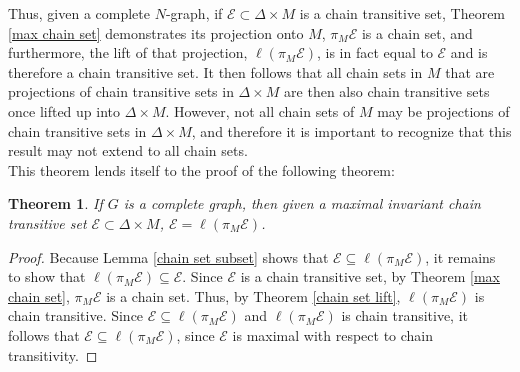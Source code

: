 \documentclass[11pt]{article}
\newtheorem{thm}{Theorem}
\begin{document}
Thus, given a complete $N$-graph, if $\mathcal{E}\subset\Delta\times M$ is a chain transitive set, Theorem \ref{max chain set} demonstrates its projection onto $M$, $\pi_M\mathcal{E}$ is a chain set, and furthermore, the lift of that projection, $\ell(\pi_M\mathcal{E})$, is in fact equal to $\mathcal{E}$ and is therefore a chain transitive set.  It then follows that all chain sets in $M$ that are projections of chain transitive sets in $\Delta\times M$ are then also chain transitive sets once lifted up into $\Delta\times M$.  However, not all chain sets of $M$ may be projections of chain transitive sets in $\Delta\times M$, and therefore it is important to recognize that this result may not extend to all chain sets. \\
This theorem lends itself to the proof of the following theorem:

\begin{thm}\label{complete graph}
If $G$ is a complete graph, then given a maximal invariant chain transitive set $\mathcal{E}\subset \Delta\times M$, $\mathcal{E}=\ell(\pi_M\mathcal{E})$.
\end{thm}
\begin{proof}
Because Lemma \ref{chain set subset} shows that $\mathcal{E}\subseteq\ell(\pi_M\mathcal{E})$, it remains to show that $\ell(\pi_M\mathcal{E})\subseteq\mathcal{E}$. Since $\mathcal{E}$ is a chain transitive set, by Theorem \ref{max chain set}, $\pi_M\mathcal{E}$ is a chain set.  Thus, by Theorem \ref{chain set lift}, $\ell(\pi_M\mathcal{E})$ is chain transitive.  
Since $\mathcal{E}\subseteq \ell(\pi_M\mathcal{E})$ and $\ell(\pi_M\mathcal{E})$ is chain transitive, it follows that $\mathcal{E}\subseteq\ell(\pi_M\mathcal{E})$, since $\mathcal{E}$ is maximal with respect to chain transitivity. 
\end{proof}




\end{document}
